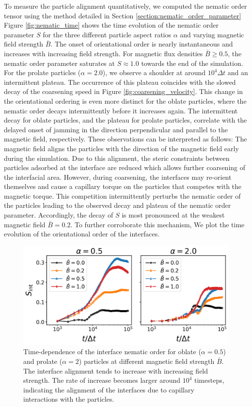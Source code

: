 To measure the particle alignment quantitatively, we computed the
nematic order tensor using the method detailed in Section \ref{section:nematic_order_parameter} 
Figure \ref{fig:nematic_time} shows the time evolution of the nematic
order parameter \(S\) for the three different particle aspect ratios
\(\alpha\) and varying magnetic field strength \(\bar{B}\). The onset of
orientational order is nearly instantaneous and increases with
increasing field strength. For magnetic flux densities
\(\bar{B}\ge0.5\), the nematic order parameter saturates at
\(S\approx 1.0\) towards the end of the simulation. For the prolate
particles (\(\alpha=2.0\)), we observe a shoulder at around
\(10^4\Delta t\) and an intermittent plateau. The occurrence of this
plateau coincides with the slowed decay of the coarsening speed in Figure
\ref{fig:coarsening_velocity}. This change in the orientational ordering
is even more distinct for the oblate particles, where the nematic order
decays intermittently before it increases again. The intermittent decay
for oblate particles, and the plateau for prolate particles, correlate
with the delayed onset of jamming in the direction perpendicular and
parallel to the magnetic field, respectively. These observations can be
interpreted as follows: The magnetic field aligns the particles with the
direction of the magnetic field early during the simulation. Due to this
alignment, the steric constraints between particles adsorbed at the
interface are reduced which allows further coarsening of the interfacial
area. However, during coarsening, the interfaces may re-orient
themselves and cause a capillary torque on the particles that competes
with the magnetic torque. This competition intermittently perturbs the
nematic order of the particles leading to the observed decay and plateau
of the nematic order parameter. Accordingly, the decay of \(S\) is most
pronounced at the weakest magnetic field \(\bar{B}=0.2\). To further corroborate 
this mechanism, We plot the time evolution of the orientational order of the interfaces. 

\begin{figure}
\centering
\includegraphics[scale = 0.4]{figures/results/paper1/interface_nematic.png}
\caption{Time-dependence of the interface nematic order for oblate ($\alpha=0.5$) and prolate ($\alpha=2$) particles at different magnetic field strength $\bar{B}$. The interface alignment tends to increase with increasing field strength. The rate of increase becomes larger around $10^4$ timesteps, indicating the alignment of the interfaces due to capillary interactions with the particles.}
\label{fig:interface_nematic}
\end{figure}

